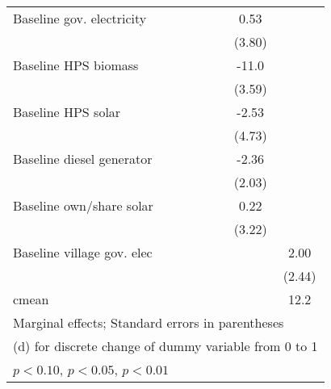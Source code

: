 \begin{table}[htbp]
\begin{tabular*}{1\hsize}{@{\hskip\tabcolsep\extracolsep\fill}l*{6}{c}}
Baseline gov. electricity&                  &                  &                  &                  &     0.53         &                  \\
                &                  &                  &                  &                  &   (3.80)         &                  \\
Baseline HPS biomass&                  &                  &                  &                  &    -11.0\sym{***}&                  \\
                &                  &                  &                  &                  &   (3.59)         &                  \\
Baseline HPS solar&                  &                  &                  &                  &    -2.53         &                  \\
                &                  &                  &                  &                  &   (4.73)         &                  \\
Baseline diesel generator&                  &                  &                  &                  &    -2.36         &                  \\
                &                  &                  &                  &                  &   (2.03)         &                  \\
Baseline own/share solar&                  &                  &                  &                  &     0.22         &                  \\
                &                  &                  &                  &                  &   (3.22)         &                  \\
Baseline village gov. elec&                  &                  &                  &                  &                  &     2.00         \\
                &                  &                  &                  &                  &                  &   (2.44)         \\
\midrule
cmean           &                  &                  &                  &                  &                  &     12.2         \\
\bottomrule
\multicolumn{7}{l}{\footnotesize Marginal effects; Standard errors in parentheses}\\
\multicolumn{7}{l}{\footnotesize  (d) for discrete change of dummy variable from 0 to 1}\\
\multicolumn{7}{l}{\footnotesize \sym{*} \(p<0.10\), \sym{**} \(p<0.05\), \sym{***} \(p<0.01\)}\\
\end{tabular*}
\end{table}
